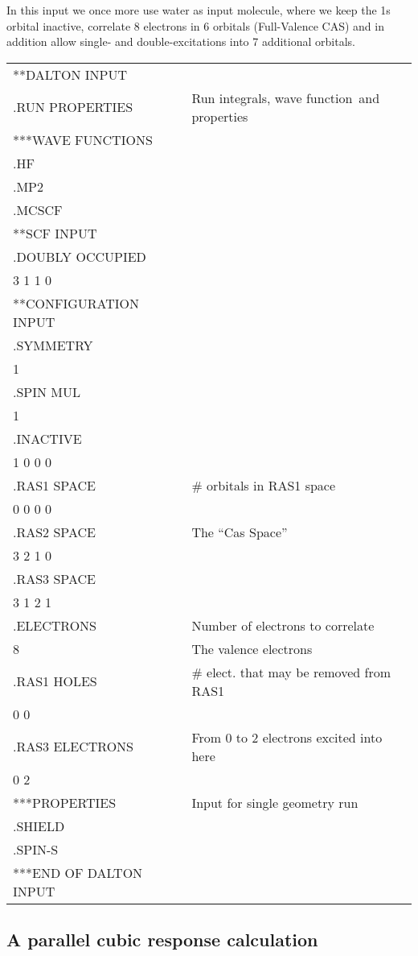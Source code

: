 In this input we once more use water as input molecule,
where we keep
the 1s orbital inactive, correlate 8 electrons in 6 orbitals (Full-Valence
CAS) and in addition allow single- and double-excitations into
7 additional orbitals.

{\ttfamily
\begin{tabular}{ll}
**DALTON INPUT\\
.RUN PROPERTIES\hspace{2cm} & Run integrals, wave function\ and properties\\
***WAVE FUNCTIONS\\
.HF\\
.MP2\\
.MCSCF\\
**SCF INPUT\\
.DOUBLY OCCUPIED\\
 3 1 1 0\\
**CONFIGURATION INPUT\\
.SYMMETRY\\
 1\\
.SPIN MUL\\
 1\\
.INACTIVE\\
 1 0 0 0\\
.RAS1 SPACE & \# orbitals in RAS1 space\\
 0 0 0 0\\
.RAS2 SPACE & The ``Cas Space''\\
 3 2 1 0\\
.RAS3 SPACE\\
 3 1 2 1\\
.ELECTRONS  & Number of electrons to correlate\\
 8 & The valence electrons\\
.RAS1 HOLES & \# elect. that may be removed from RAS1\\
 0 0\\
.RAS3 ELECTRONS & From 0 to 2 electrons excited into here\\
 0 2\\
***PROPERTIES & Input for single geometry run\\
.SHIELD\\
.SPIN-S\\
***END OF DALTON INPUT\\
\end{tabular}}

\subsection{A parallel cubic response calculation}

